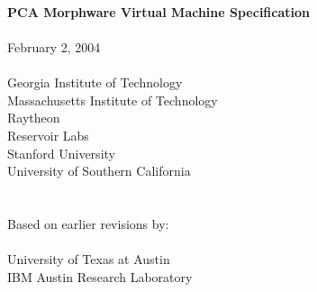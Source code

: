 \documentclass[10pt]{article}
\begin{document}
  \begin{titlepage}
    \begin{center}
      {\LARGE
	~ \\ ~ \\ ~ \\ ~ \\ ~ \\ ~ \\ ~ \\ ~ \\
	{\bf PCA Morphware Virtual Machine Specification \\ ~ \\}
      }
      {\Large
	February 2, 2004 \\ ~ \\
      }
      {\large
	Georgia Institute of Technology \\
	Massachusetts Institute of Technology \\ Raytheon \\ Reservoir Labs \\ Stanford University \\ University of Southern California \\ ~ \\ ~ \\ 
	Based on earlier revisions by: \\ ~ \vspace{-8pt} \\
	University of Texas at Austin \\ IBM Austin Research Laboratory
      }
    \end{center}
  \end{titlepage}

  \newcommand{\mt}[1]{\mbox{\it #1}}
  \newcommand{\todo}[1]{\framebox{\bf #1}}
  \newcommand{\sss}[1]{\medskip \noindent {\bf #1} \smallskip}
  \newcommand{\ssss}[1]{\medskip \noindent {\bf #1:}}
  \newcommand{\makeline}[0]{\rule{0cm}{0cm}\\\hrule\rule{0cm}{0cm}}

  \newcommand{\lp}[2]{\raisebox{-6pt}{\parbox{#1}{#2 \vspace{2pt}}}}
  \newcommand{\lpp}[2]{\raisebox{-13pt}{\parbox{#1}{#2 \vspace{2pt}}}}

  \newcommand{\name}[1]{

    \medskip \noindent {\bf #1}
  }

  \newcommand{\decl}[1]{

    \medskip \noindent {\tt #1} \medskip
  }
\end{document}
